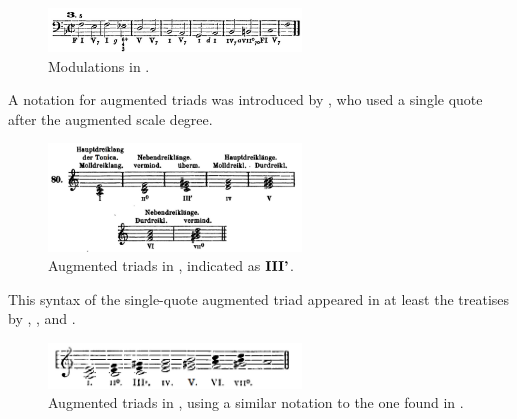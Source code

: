 \begin{figure}[h!]
    \centering
    \includegraphics[width=0.6\textwidth]{figures/chapter/2/primary_sources/emery1879elements102.png}
    \caption{Modulations in \textcite{emery1879elements}.}
    \label{fig:emery1879elements102}
\end{figure}

A notation for augmented triads was introduced by \textcite{jadassohn1883lehrbuch}, who used a single quote after the augmented scale degree.

\begin{figure}[h!]
    \centering
    \includegraphics[width=0.6\textwidth]{figures/chapter/2/primary_sources/jadassohn1883lehrbuch038.png}
    \caption{Augmented triads in \textcite{jadassohn1883lehrbuch}, indicated as $\textbf{III'}\relax\relax$.}
    \label{fig:jadassohn1883lehrbuch038}
\end{figure}

This syntax of the single-quote augmented triad appeared in at least the treatises by \textcite{broekhoven1889system}, \textcite{buwa1893schule}, and \textcite{shepard1896harmony}.

\begin{figure}
    \centering
    \includegraphics[width=0.6\textwidth]{figures/chapter/2/primary_sources/broekhoven1889system028.png}
    \caption{Augmented triads in \textcite{broekhoven1889system}, using a similar notation to the one found in \textcite{jadassohn1883lehrbuch}.}
    \label{fig:broekhoven1889system028}
\end{figure}


